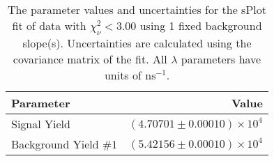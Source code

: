 
\begin{table}
    \begin{center}
        \begin{tabular}{lr}\toprule
            Parameter & Value \\\midrule
            Signal Yield & $(4.70701 \pm 0.00010) \times 10^{4}$ \\
            Background Yield $\#1$ & $(5.42156 \pm 0.00010) \times 10^{4}$ \\\bottomrule
        \end{tabular}
        \caption{The parameter values and uncertainties for the sPlot fit of data with $\chi^2_\nu < 3.00$ using 1 fixed background slope(s). Uncertainties are calculated using the covariance matrix of the fit. All $\lambda$ parameters have units of $\si{\nano\second}^{-1}$.}
    \end{center}
\end{table}
